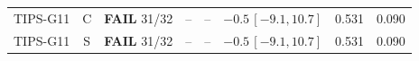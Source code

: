 \documentclass[10pt,a4paper]{article}
\begin{document}
\begin{longtable}{lcp{37mm}rrp{37mm}rr}
TIPS-G11 & C & \textbf{FAIL} 31/32 & -- & -- & \(-0.5\,[-9.1,10.7]\) & 0.531 & 0.090\\
TIPS-G11 & S & \textbf{FAIL} 31/32 & -- & -- & \(-0.5\,[-9.1,10.7]\) & 0.531 & 0.090\\

\end{longtable}
\end{document}
